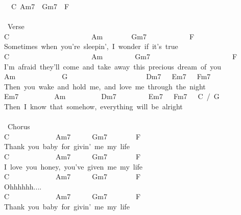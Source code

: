 {\lbrack\ \ C\ Am7\ \ Gm7\ \ F\ \rbrack\\
\\
\lbrack\ Verse\rbrack\\
C\ \ \ \ \ \ \ \ \ \ \ \ \ \ \ \ \ \ \ \ \ \ \ Am\ \ \ \ \ \ \ \ Gm7\ \ \ \ \ \ \ \ \ \ \ \ F\\
Sometimes\ when\ you're\ sleepin',\ I\ wonder\ if\ it's\ true\\
C\ \ \ \ \ \ \ \ \ \ \ \ \ \ \ \ \ \ \ \ \ \ \ Am\ \ \ \ \ \ \ \ \ Gm7\ \ \ \ \ \ \ \ \ \ \ \ \ \ \ \ \ \ \ \ \ \ \ F\\
I'm\ afraid\ they'll\ come\ and\ take\ away\ this\ precious\ dream\ of\ you\\
Am\ \ \ \ \ \ \ \ \ \ \ \ \ G\ \ \ \ \ \ \ \ \ \ \ \ \ \ \ \ \ \ \ \ \ \ Dm7\ \ \ Em7\ \ \ Fm7\\
Then\ you\ wake\ and\ hold\ me,\ and\ love\ me\ through\ the\ night\\
Em7\ \ \ \ \ \ \ \ \ \ Am\ \ \ \ \ \ \ \ \ \ Dm7\ \ \ \ \ \ \ \ \ Em7\ \ \ Fm7\ \ \ C\ /\ G\\
Then\ I\ know\ that\ somehow,\ everything\ will\ be\ alright\\
\\
\lbrack\ Chorus\rbrack\\
C\ \ \ \ \ \ \ \ \ \ \ \ \ Am7\ \ \ \ \ \ Gm7\ \ \ \ \ \ \ \ F\\
Thank\ you\ baby\ for\ givin'\ me\ my\ life\\
C\ \ \ \ \ \ \ \ \ \ \ \ \ Am7\ \ \ \ \ \ Gm7\ \ \ \ \ \ \ \ F\\
I\ love\ you\ honey,\ you've\ given\ me\ my\ life\\
C\ \ \ \ \ \ \ \ \ \ \ \ \ Am7\ \ \ \ \ \ Gm7\ \ \ \ \ \ \ \ F\\
Ohhhhhh....\\
C\ \ \ \ \ \ \ \ \ \ \ \ \ Am7\ \ \ \ \ \ Gm7\ \ \ \ \ \ \ \ F\\
Thank\ you\ baby\ for\ givin'\ me\ my\ life}
